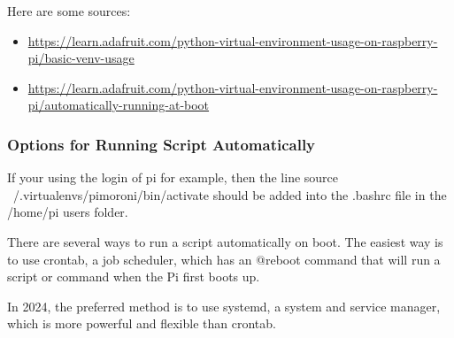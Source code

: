 \documentclass{article}
\begin{document}
Here are some sources: 

\begin{itemize}
\item \url{https://learn.adafruit.com/python-virtual-environment-usage-on-raspberry-pi/basic-venv-usage}

\item \url{https://learn.adafruit.com/python-virtual-environment-usage-on-raspberry-pi/automatically-running-at-boot}
\end{itemize}

\subsubsection{Options for Running Script Automatically}

If your using the login of pi for example, then the line source ~/.virtualenvs/pimoroni/bin/activate should be added into the .bashrc file in the /home/pi users folder.

There are several ways to run a script automatically on boot. The easiest way is to use crontab, a job scheduler, which has an @reboot command that will run a script or command when the Pi first boots up.

In 2024, the preferred method is to use systemd, a system and service manager, which is more powerful and flexible than crontab.
\end{document}
